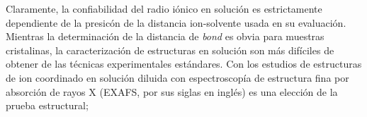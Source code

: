 Claramente, la confiabilidad del radio i\'onico en soluci\'on es
estrictamente dependiente de la presic\'on de la distancia 
ion-solvente usada en su evaluaci\'on. Mientras la determinaci\'on de
la distancia de {\it bond} es obvia para muestras cristalinas, la
caracterizaci\'on de estructuras en soluci\'on son m\'as dif\'iciles
de obtener de las t\'ecnicas experimentales est\'andares. Con los 
estudios de estructuras  de ion coordinado en soluci\'on diluida con
espectroscop\'ia de estructura fina por absorci\'on de rayos X 
(EXAFS, por sus siglas en ingl\'es) es una elecci\'on de la prueba 
estructural; 
